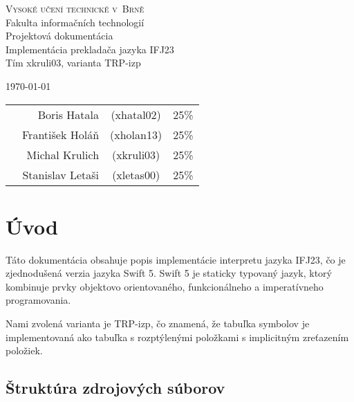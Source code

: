 \documentclass[a4paper,11pt]{article}
\begin{document}
\begin{center}
\Huge
\textsc{Vysoké učení technické v~Brně\\
}Fakulta informačních technologií\\
\Huge Projektová dokumentácia \\
\LARGE Implementácia prekladača jazyka IFJ23 \\
\Large Tím xkruli03, varianta TRP-izp\\

\Large 


\end{center}
{\Large \today \hfill
\begin{tabular}{l r c r}
            &Boris Hatala	      &(xhatal02)	&25\%	\\
            &František Holáň	  &(xholan13)	&25\%	\\
        	&Michal Krulich	      &(xkruli03)	&25\%	\\ 
			&Stanislav Letaši	  &(xletas00)	&25\%	\\
\end{tabular}}
\thispagestyle{empty}

\newpage

\tableofcontents

\newpage

\section{Úvod}
Táto dokumentácia obsahuje popis implementácie interpretu jazyka IFJ23, čo je zjednodušená verzia jazyka Swift 5. Swift 5 je staticky typovaný jazyk, ktorý kombinuje prvky objektovo orientovaného, funkcionálneho a imperatívneho programovania.

Nami zvolená varianta je TRP-izp, čo znamená, že tabuľka symbolov je implementovaná ako tabuľka s rozptýlenými položkami s implicitným zreťazením položiek.

\subsection{Štruktúra zdrojových súborov}
\end{document}
